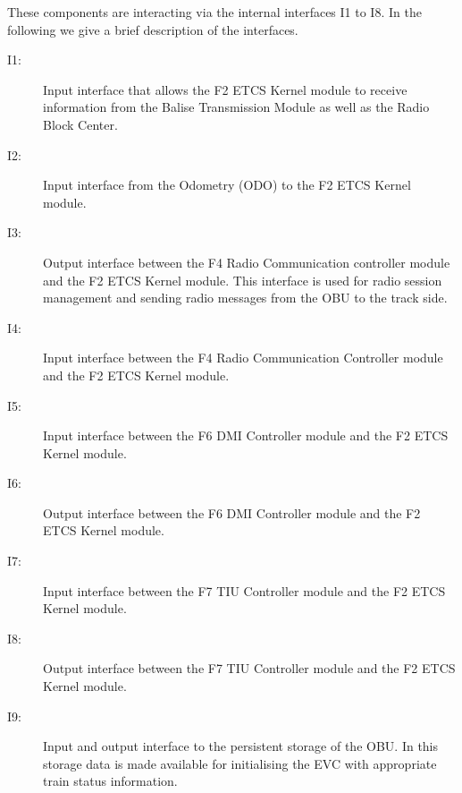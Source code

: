 These components are interacting via the internal interfaces I1 to I8. In the following we give a brief description of the interfaces.
\begin{description}
\item[I1:] Input interface that allows the F2 ETCS Kernel module to receive information from the Balise Transmission Module as well as the Radio Block Center.

\item[I2:] Input interface from the Odometry (ODO) to the F2 ETCS Kernel module.

\item[I3:] Output interface between the F4 Radio Communication controller module and the F2 ETCS Kernel module. This interface is used for radio session management and sending radio messages from the OBU to the track side.

\item[I4:] Input interface between the F4 Radio Communication Controller module and the F2 ETCS Kernel module.

\item[I5:] Input interface between the F6 DMI Controller module and the F2 ETCS Kernel module.

\item[I6:] Output interface between the F6 DMI Controller module and the F2 ETCS Kernel module.

\item[I7:] Input interface between the F7 TIU Controller module and the F2 ETCS Kernel module.

\item[I8:] Output interface between the F7 TIU Controller module and the F2 ETCS Kernel module.
\item[I9:] Input and output interface to the persistent storage of the OBU. In this storage data is made available for initialising the EVC with appropriate train status information.

\end{description}






